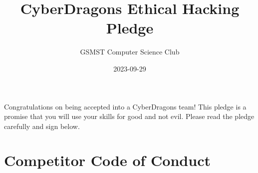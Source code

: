 \documentclass[
  letterpaper,
  DIV=11,
  numbers=noendperiod]{scrartcl}
\title{CyberDragons Ethical Hacking Pledge}
\author{GSMST Computer Science Club}
\date{2023-09-29}
\begin{document}
\maketitle
{}
Congratulations on being accepted into a CyberDragons team! This pledge
is a promise that you will use your skills for good and not evil. Please
read the pledge carefully and sign below.

\section{Competitor Code of Conduct}\label{competitor-code-of-conduct}
\end{document}
